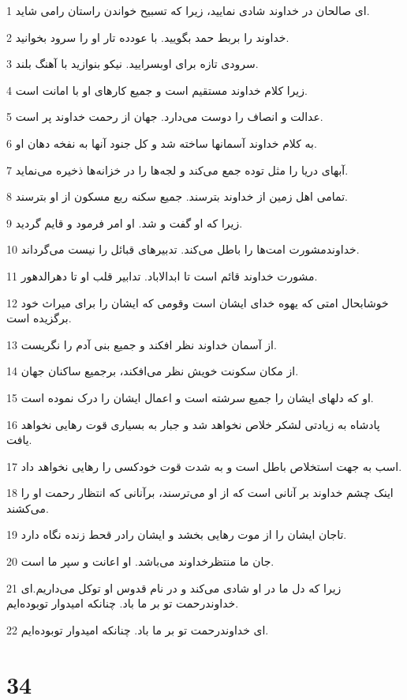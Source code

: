 \par 1 ای صالحان در خداوند شادی نمایید، زیرا که تسبیح خواندن راستان رامی شاید.
\par 2 خداوند را بربط حمد بگویید. با عودده تار او را سرود بخوانید.
\par 3 سرودی تازه برای اوبسرایید. نیکو بنوازید با آهنگ بلند.
\par 4 زیرا کلام خداوند مستقیم است و جمیع کارهای او با امانت است.
\par 5 عدالت و انصاف را دوست می‌دارد. جهان از رحمت خداوند پر است.
\par 6 به کلام خداوند آسمانها ساخته شد و کل جنود آنها به نفخه دهان او.
\par 7 آبهای دریا را مثل توده جمع می‌کند و لجه‌ها را در خزانه‌ها ذخیره می‌نماید.
\par 8 تمامی اهل زمین از خداوند بترسند. جمیع سکنه ربع مسکون از او بترسند.
\par 9 زیرا که او گفت و شد. او امر فرمود و قایم گردید.
\par 10 خداوندمشورت امت‌ها را باطل می‌کند. تدبیرهای قبائل را نیست می‌گرداند.
\par 11 مشورت خداوند قائم است تا ابدالاباد. تدابیر قلب او تا دهرالدهور.
\par 12 خوشابحال امتی که یهوه خدای ایشان است وقومی که ایشان را برای میراث خود برگزیده است.
\par 13 از آسمان خداوند نظر افکند و جمیع بنی آدم را نگریست.
\par 14 از مکان سکونت خویش نظر می‌افکند، برجمیع ساکنان جهان.
\par 15 او که دلهای ایشان را جمیع سرشته است و اعمال ایشان را درک نموده است.
\par 16 پادشاه به زیادتی لشکر خلاص نخواهد شد و جبار به بسیاری قوت رهایی نخواهد یافت.
\par 17 اسب به جهت استخلاص باطل است و به شدت قوت خودکسی را رهایی نخواهد داد.
\par 18 اینک چشم خداوند بر آنانی است که از او می‌ترسند، برآنانی که انتظار رحمت او را می‌کشند.
\par 19 تاجان ایشان را از موت رهایی بخشد و ایشان رادر قحط زنده نگاه دارد.
\par 20 جان ما منتظرخداوند می‌باشد. او اعانت و سپر ما است.
\par 21 زیرا که دل ما در او شادی می‌کند و در نام قدوس او توکل می‌داریم.‌ای خداوندرحمت تو بر ما باد. چنانکه امیدوار توبوده‌ایم.
\par 22 ‌ای خداوندرحمت تو بر ما باد. چنانکه امیدوار توبوده‌ایم.
 
\chapter{34}

